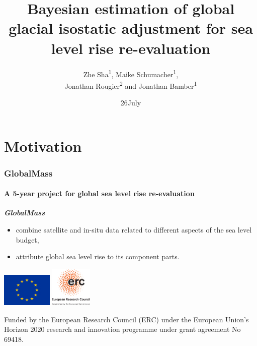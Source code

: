 \documentclass{beamer}
\title[BHM for GIA and global sea level rise]{Bayesian estimation of global glacial isostatic adjustment for sea level rise re-evaluation} %
\author%
[Z. Sha et. al]{Zhe Sha\textsuperscript{1},  Maike Schumacher\textsuperscript{1},  \\ 
 Jonathan Rougier\textsuperscript{2} and Jonathan Bamber\textsuperscript{1}
}
\institute%
{%
    \textsuperscript{1}School of Geographical Sciences,\textsuperscript{2}School of Mathematics\\
    University of Bristol
}
\date{26\space July \space 2017}
\begin{document}
\begin{frame}[plain]
      \titlepage
\end{frame}

\section{Motivation}
\begin{frame}
\frametitle{GlobalMass}
\framesubtitle{A 5-year project for global sea level rise re-evaluation}


\emph{\textbf{GlobalMass}}
\begin{itemize}
\item combine satellite and in-situ data related to different aspects of the sea level budget,
\item attribute global sea level rise to its component parts.
\end{itemize}


\begin{center}
\includegraphics[width = 0.18\textwidth, clip]{images/EUflag}
\hspace{2cm}
\includegraphics[width = 0.15\textwidth, clip]{images/ERClogo}
\end{center}
 
    \footnotesize{Funded by the European Research Council (ERC) under the European Union's Horizon 2020 research and innovation programme under grant agreement No 69418.}




\end{frame}
\end{document}

